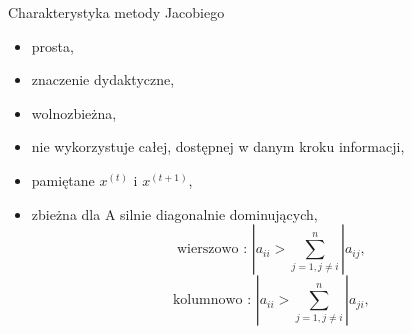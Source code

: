 \begin{frame}{}
  \begin{block}{Charakterystyka metody Jacobiego}
    \begin{itemize}
      \item prosta,
      \item znaczenie dydaktyczne,
      \item wolnozbieżna,
      \item nie wykorzystuje całej, dostępnej w danym kroku informacji,
      \item pamiętane $x^{(t)}$ i $x^{(t+1)}$,
      \item zbieżna dla A silnie diagonalnie dominujących,
      $$\text{wierszowo : }|a_{ii} > \sum_{j=1,j\neq i}^{n} |a_{ij},$$
      $$\text{kolumnowo : }|a_{ii} > \sum_{j=1,j\neq i}^{n} |a_{ji},$$
    \end{itemize}
  \end{block}
\end{frame}
